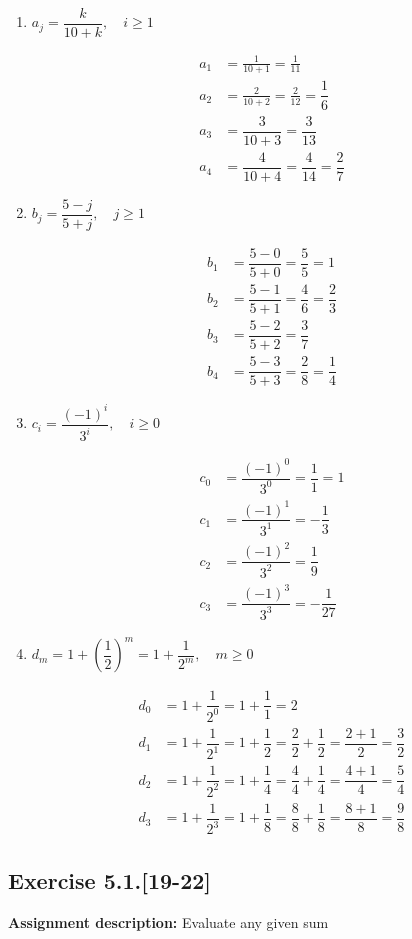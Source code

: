 \documentclass{report}
\newcommand{\mAlign}[1]{\begin{align*}#1\end{align*}}
\newcommand{\AssignmentDescription}{\textbf{Assignment description: }}
\newcommand{\Exercise}[1]{\subsection{Exercise #1}}
\newcommand{\parenthesis}[1]{\left( #1 \right)}
\begin{document}
	\begin{enumerate}
		\item $ a_j = \dfrac{k}{10+k}, \quad i \geq 1$
		
		\mAlign{
			a_1 &= \frac{1}{10+1} = \frac{1}{11} \\
			a_2 &= \frac{2}{10+2} = \frac{2}{12} = \dfrac{1}{6}\\
			a_3 &= \dfrac{3}{10+3} = \dfrac{3}{13} \\
			a_4 &= \dfrac{4}{10+4} = \dfrac{4}{14} = \dfrac{2}{7}
		}
		
		\item $ b_j = \dfrac{5-j}{5+j}, \quad j \geq 1$
		
		\mAlign{b_1 &= \dfrac{5-0}{5+0} = \dfrac{5}{5} = 1\\
					 b_2 &= \dfrac{5-1}{5+1} = \dfrac{4}{6} = \dfrac{2}{3} \\
				 	 b_3 &= \dfrac{5-2}{5+2} = \dfrac{3}{7} \\
			 	 	 b_4 &= \dfrac{5-3}{5+3} = \dfrac{2}{8} = \dfrac{1}{4}}
		
		\item $c_i = \dfrac{(-1)^i}{3^i}, \quad i \geq 0$
		
		\mAlign{c_0 &= \dfrac{(-1)^0}{3^0} = \dfrac{1}{1} = 1 \\
					 c_1 &= \dfrac{(-1)^1}{3^1} = - \dfrac{1}{3} \\
				 	 c_2 &= \dfrac{(-1)^2}{3^2} = \dfrac{1}{9} \\
			 	     c_3 &= \dfrac{(-1)^3}{3^3} = -\dfrac{1}{27}}
		
		\item $d_m = 1 + \parenthesis{\dfrac{1}{2}}^m = 1 + \dfrac{1}{2^m}, \quad m \geq 0$
		
		\mAlign{ d_0 &= 1 + \dfrac{1}{2^0} = 1 + \dfrac{1}{1} = 2 \\
					 d_1 &= 1+ \dfrac{1}{2^1} = 1+ \dfrac{1}{2} = \dfrac{2}{2} + \dfrac{1}{2} = \dfrac{2+1}{2} = \dfrac{3}{2} \\
				 	 d_2 &= 1 + \dfrac{1}{2^2} = 1 + \dfrac{1}{4} = \dfrac{4}{4} + \dfrac{1}{4} = \dfrac{4+1}{4} = \dfrac{5}{4} \\
			 		 d_3 &= 1 + \dfrac{1}{2^3} = 1+\dfrac{1}{8} = \dfrac{8}{8} + \dfrac{1}{8} = \dfrac{8+1}{8}=\dfrac{9}{8}}
		
	\end{enumerate}
	\Exercise{5.1.[19-22]}
	
	\AssignmentDescription
	Evaluate any given sum
		
\end{document}

